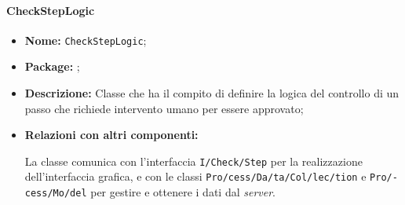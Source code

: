 \paragraph{CheckStepLogic}
\begin{flushleft}
\begin{itemize}
\item \textbf{Nome:} \texttt{CheckStepLogic};
\item \textbf{Package:} \texttt{\logicAdmin{}};
\item \textbf{Descrizione:} Classe che ha il compito di definire la logica del controllo di un passo che richiede intervento umano per essere approvato;
\item \textbf{Relazioni con altri componenti:}
\begin{sloppypar}
La classe comunica con l'interfaccia \texttt{\viewAdmin{}I\fshyp{}Check\fshyp{}Step} per la realizzazione dell'interfaccia grafica, e con le classi \texttt{\collection{}Pro\fshyp{}cess\fshyp{}Da\fshyp{}ta\fshyp{}Col\fshyp{}lec\fshyp{}tion} e \texttt{\model{}Pro\fshyp{}cess\fshyp{}Mo\fshyp{}del} per gestire e ottenere i dati dal \textit{server}.
\end{sloppypar}
\end{itemize}
\end{flushleft}